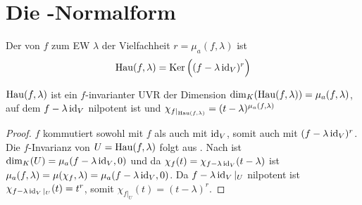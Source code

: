 \section{Die -Normalform}

\begin{definition}[Hauptraum]
	Der  von $f$ zum EW $\lambda$ der Vielfachheit $r=\mu_a(f,\lambda)$ ist
	\begin{align}
		\operatorname{Hau}(f,\lambda)=\operatorname{Ker}\Big( (f-\lambda\operatorname{id}_V)^r\Big) \notag
	\end{align}
\end{definition}

\begin{lemma}
	$\operatorname{Hau}(f,\lambda)$ ist ein $f$-invarianter UVR der Dimension $\dim_K(\operatorname{Hau}(f,\lambda))= \mu_a(f,\lambda)$, auf dem $f-\lambda\operatorname{id}_V$ nilpotent ist und $\chi_{f\vert_{\operatorname{Hau}(f,\lambda)}}= (t-\lambda)^{\mu_a(f,\lambda)}$
\end{lemma}
\begin{proof}
	$f$ kommutiert sowohl mit $f$ als auch mit $\operatorname{id}_V$, somit auch mit $(f-\lambda\operatorname{id}_V)^r$. Die $f$-Invarianz von $U=\operatorname{Hau}(f,\lambda)$ folgt aus . Nach  ist $\dim_K(U)=\mu_a(f-\lambda\operatorname{id}_V,0)$ und da $\chi_f(t)=\chi_{f-\lambda\operatorname{id}_V}(t-\lambda)$ ist $\mu_a(f,\lambda)=\mu(\chi_f,\lambda)= \mu_a(f-\lambda\operatorname{id}_V,0)$. Da $f-\lambda\operatorname{id}_V\vert_U$ nilpotent ist $\chi_{f-\lambda\operatorname{id}_V\vert_U}(t)= t^r$, somit $\chi_{f\vert_U}(t)=(t-\lambda)^r$.
\end{proof}

